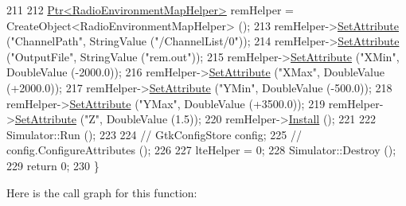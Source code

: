 \begin{DoxyCode}
211 
212   \hyperlink{classns3_1_1Ptr}{Ptr<RadioEnvironmentMapHelper>} remHelper = 
      CreateObject<RadioEnvironmentMapHelper> ();
213   remHelper->\hyperlink{classns3_1_1ObjectBase_ac60245d3ea4123bbc9b1d391f1f6592f}{SetAttribute} (\textcolor{stringliteral}{"ChannelPath"}, StringValue (\textcolor{stringliteral}{"/ChannelList/0"}));
214   remHelper->\hyperlink{classns3_1_1ObjectBase_ac60245d3ea4123bbc9b1d391f1f6592f}{SetAttribute} (\textcolor{stringliteral}{"OutputFile"}, StringValue (\textcolor{stringliteral}{"rem.out"}));
215   remHelper->\hyperlink{classns3_1_1ObjectBase_ac60245d3ea4123bbc9b1d391f1f6592f}{SetAttribute} (\textcolor{stringliteral}{"XMin"}, DoubleValue (-2000.0));
216   remHelper->\hyperlink{classns3_1_1ObjectBase_ac60245d3ea4123bbc9b1d391f1f6592f}{SetAttribute} (\textcolor{stringliteral}{"XMax"}, DoubleValue (+2000.0));
217   remHelper->\hyperlink{classns3_1_1ObjectBase_ac60245d3ea4123bbc9b1d391f1f6592f}{SetAttribute} (\textcolor{stringliteral}{"YMin"}, DoubleValue (-500.0));
218   remHelper->\hyperlink{classns3_1_1ObjectBase_ac60245d3ea4123bbc9b1d391f1f6592f}{SetAttribute} (\textcolor{stringliteral}{"YMax"}, DoubleValue (+3500.0));
219   remHelper->\hyperlink{classns3_1_1ObjectBase_ac60245d3ea4123bbc9b1d391f1f6592f}{SetAttribute} (\textcolor{stringliteral}{"Z"}, DoubleValue (1.5));
220   remHelper->\hyperlink{classns3_1_1RadioEnvironmentMapHelper_a0b15c982ea80037f9409d73654b48548}{Install} ();
221 
222   Simulator::Run ();
223 
224 \textcolor{comment}{//  GtkConfigStore config;}
225 \textcolor{comment}{//  config.ConfigureAttributes ();}
226 
227   lteHelper = 0;
228   Simulator::Destroy ();
229   \textcolor{keywordflow}{return} 0;
230 \}
\end{DoxyCode}


Here is the call graph for this function\+:


